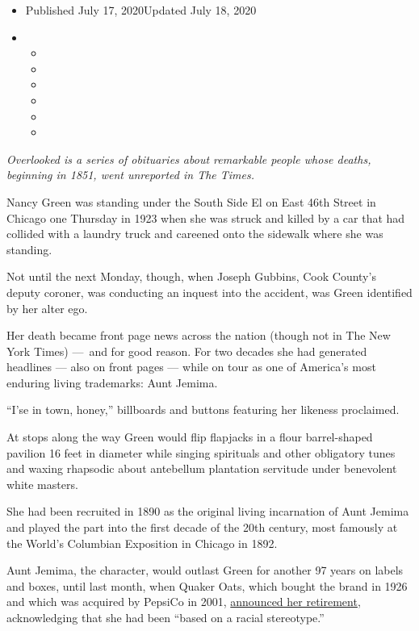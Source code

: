 \begin{itemize}
\item
  Published July 17, 2020Updated July 18, 2020
\item
  \begin{itemize}
  \item
  \item
  \item
  \item
  \item
  \item
  \end{itemize}
\end{itemize}

\emph{Overlooked is a series of obituaries about remarkable people whose
deaths, beginning in 1851, went unreported in The Times.}

Nancy Green was standing under the South Side El on East 46th Street in
Chicago one Thursday in 1923 when she was struck and killed by a car
that had collided with a laundry truck and careened onto the sidewalk
where she was standing.

Not until the next Monday, though, when Joseph Gubbins, Cook County's
deputy coroner, was conducting an inquest into the accident, was Green
identified by her alter ego.

Her death became front page news across the nation (though not in The
New York Times) ---~and for good reason. For two decades she had
generated headlines --- also on front pages --- while on tour as one of
America's most enduring living trademarks: Aunt Jemima.

``I'se in town, honey,'' billboards and buttons featuring her likeness
proclaimed.

At stops along the way Green would flip flapjacks in a flour
barrel-shaped pavilion 16 feet in diameter while singing spirituals and
other obligatory tunes and waxing rhapsodic about antebellum plantation
servitude under benevolent white masters.

She had been recruited in 1890 as the original living incarnation of
Aunt Jemima and played the part into the first decade of the 20th
century, most famously at the World's Columbian Exposition in Chicago in
1892.

Aunt Jemima, the character, would outlast Green for another 97 years on
labels and boxes, until last month, when Quaker Oats, which bought the
brand in 1926 and which was acquired by PepsiCo in 2001,
\href{https://www.nytimes.com/2020/06/17/business/aunt-jemima-racial-stereotype.html}{announced
her retirement}, acknowledging that she had been ``based on a racial
stereotype.''

